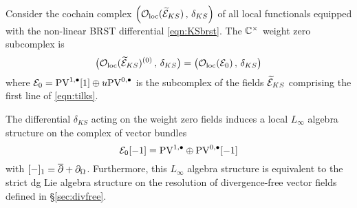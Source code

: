 \documentclass[11pt]{amsart}
\begin{document}
Consider the cochain complex $\left({\mathcal O}_{\rm loc}(\widetilde{\mathcal E}_{KS}) \, , \, \delta_{KS} \right)$ of all local functionals equipped with the non-linear BRST differential \eqref{eqn:KSbrst}.  
The $\mathbb C^\times$ weight zero subcomplex is 
\[
\big({\mathcal O}_{\rm loc}(\widetilde{\mathcal E}_{KS})^{(0)} \, , \, \delta_{KS} \big) = \big({\mathcal O}_{\rm loc}(\mathcal E_0) \, , \, \delta_{KS} \big) 
\]
where $\mathcal E_0 = {\rm PV}^{1,\bullet}[1] \oplus u {\rm PV}^{0,\bullet}$ is the subcomplex of the fields $\widetilde{\mathcal E}_{KS}$ comprising the first line of \eqref{eqn:tilks}.

\begin{prop}
\label{prop:Linfty}
The differential $\delta_{KS}$ acting on the weight zero fields induces a local $L_\infty$ algebra structure on the complex of vector bundles 
\[
\mathcal E_0 [-1] = {\rm PV}^{1,\bullet} \oplus {\rm PV}^{0,\bullet}[-1]
\]
with $[-]_1 = \overline{\partial} + \partial_{\Omega}$. 
Furthermore, this $L_\infty$ algebra structure is equivalent to the strict dg Lie algebra structure on the resolution of divergence-free vector fields defined in \S \ref{sec:divfree}. 
\end{prop}


%
%
%
%
\end{document}
